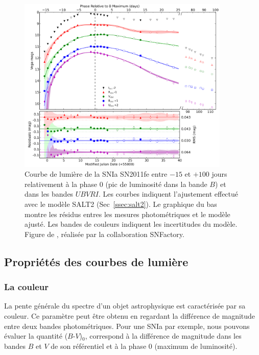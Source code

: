 \documentclass[../main/main.tex]{subfiles}
\begin{document}
\begin{figure}[ht]
  \centering
  \includegraphics[width=0.9\textwidth]{../figures/01bis_sne/lightcurvesnpereira.pdf}
  \caption[Courbe de lumière de la SNIa
  SN2011fe.]{Courbe de lumière de la SNIa SN2011fe entre
  $-15$ et $+100$ jours relativement à la phase $0$ (pic de luminosité
  dans la bande $B$) et dans les bandes $UBVRI$. Les courbes indiquent
  l'ajustement effectué avec le modèle SALT2 (Sec~\ref{ssec:salt2}). Le
  graphique du bas montre les résidus entres les mesures photométriques
  et le modèle ajusté. Les bandes de couleurs indiquent les incertitudes
  du modèle. Figure de \citet{Pereira2013}, réalisée par la
  collaboration SNFactory.}
  \label{fig:lightcurvesnpereira}
\end{figure}

\clearpage
\subsection{Propriétés des courbes de lumière}


\subsubsection*{La couleur}

La pente générale du spectre d'un objet astrophysique est caractérisée
par sa couleur. Ce paramètre peut être obtenu en regardant la différence
de magnitude entre deux bandes photométriques. Pour une SNIa par
exemple, nous pouvons évaluer la quantité ($B$-$V$)$_{0}$, correspond à
la différence de magnitude dans les bandes $B$ et $V$ de son référentiel
et à la phase $0$ (maximum de luminosité).
\end{document}
